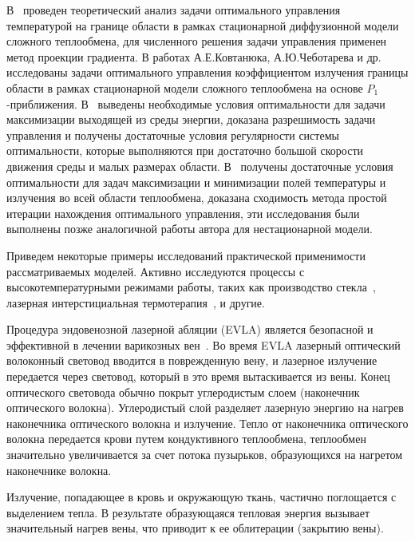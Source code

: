В~\cite{Kovtanyuk2016Optimal} проведен теоретический анализ задачи оптимального управления
температурой на границе области в рамках стационарной диффузионной модели
сложного теплообмена, для численного решения задачи управления применен
метод проекции градиента.
В работах А.Е.Ковтанюка, А.Ю.Чеботарева и др.~\cite{
    Kovtanyuk2014,
    astrakhantseva2017design,
    Chebotarev2015,
    Kovtanyuk2014TheoreticalAnalysis
}
исследованы задачи оптимального управления коэффициентом
излучения границы области в рамках стационарной модели сложного
теплообмена на основе $P_1$-приближения.
В~\cite{Kovtanyuk2014, Kovtanyuk2014TheoreticalAnalysis}
выведены необходимые условия оптимальности для задачи максимизации
выходящей из среды энергии,
доказана разрешимость задачи управления и получены достаточные условия регулярности
системы оптимальности,
которые выполняются при достаточно большой скорости движения
среды и малых размерах области.
В~\cite{end2011analytical, asllanaj2003existence}
получены достаточные условия оптимальности для задач
максимизации и минимизации полей температуры и излучения
во всей области теплообмена, доказана сходимость метода простой итерации
нахождения оптимального управления,
эти исследования были выполнены позже аналогичной работы автора
для нестационарной модели.


Приведем некоторые примеры исследований практической применимости рассматриваемых моделей.
Активно исследуются процессы с высокотемпературными режимами работы,
таких как производство стекла~\cite{frank2010optimal, clever2012optimal},
лазерная интерстициальная термотерапия~\cite{Tse2012, Hubner2017}, и другие.

Процедура эндовенозной лазерной абляции (EVLA) является безопасной и эффективной
в лечении варикозных вен~\cite{Endovenous_vandenBos2009}.
Во время EVLA лазерный оптический волоконный световод вводится в поврежденную вену,
и лазерное излучение передается через световод, который в это время вытаскивается из вены.
Конец оптического световода обычно покрыт углеродистым слоем (наконечник оптического волокна).
Углеродистый слой разделяет лазерную энергию на нагрев наконечника оптического волокна и излучение.
Тепло от наконечника оптического волокна передается крови путем кондуктивного теплообмена,
теплообмен значительно увеличивается за счет потока пузырьков,
образующихся на нагретом наконечнике волокна.

Излучение, попадающее в кровь и окружающую ткань,
частично поглощается с выделением тепла.
В результате образующаяся тепловая энергия вызывает значительный нагрев вены,
что приводит к ее облитерации (закрытию вены).

